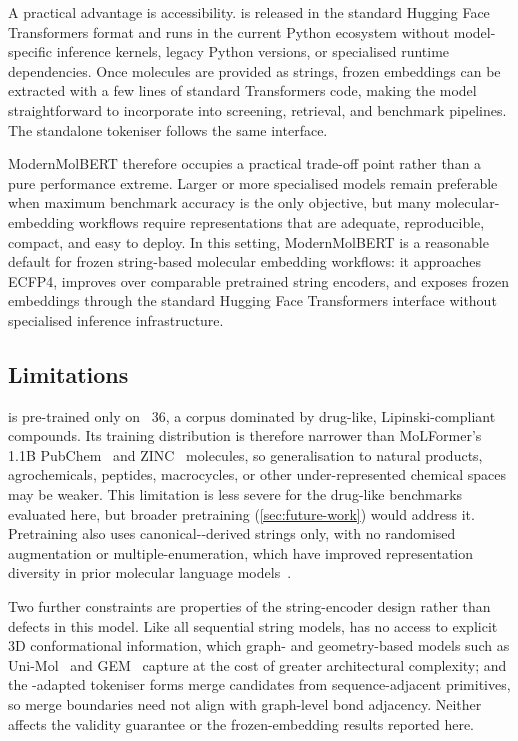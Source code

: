 \documentclass[11pt,a4paper]{article}
\begin{document}
A practical advantage is accessibility. \model{} is released in the standard Hugging Face Transformers format and runs in the current Python ecosystem without model-specific inference kernels, legacy Python versions, or specialised runtime dependencies. Once molecules are provided as \selfies{} strings, frozen embeddings can be extracted with a few lines of standard Transformers code, making the model straightforward to incorporate into screening, retrieval, and benchmark pipelines. The standalone \ape{} tokeniser follows the same interface.

ModernMolBERT therefore occupies a practical trade-off point rather than a pure performance extreme. Larger or more specialised models remain preferable when maximum benchmark accuracy is the only objective, but many molecular-embedding workflows require representations that are adequate, reproducible, compact, and easy to deploy. In this setting, ModernMolBERT is a reasonable default for frozen string-based molecular embedding workflows: it approaches ECFP4, improves over comparable pretrained string encoders, and exposes frozen embeddings through the standard Hugging Face Transformers interface without specialised inference infrastructure.

\subsection{Limitations}
\label{sec:limitations}


\model{} is pre-trained only on \chembl{}~36, a corpus dominated by drug-like,
Lipinski-compliant compounds. Its training distribution is therefore narrower
than MoLFormer's 1.1B PubChem~\citep{kimPubChem2023Update2023} and
ZINC~\citep{irwinZINC20FreeUltralargeScale2020} molecules, so generalisation to
natural products, agrochemicals, peptides, macrocycles, or other
under-represented chemical spaces may be weaker. This limitation is less severe
for the drug-like benchmarks evaluated here, but broader pretraining
(\cref{sec:future-work}) would address it. Pretraining also uses canonical-\smiles{}-derived \selfies{}
strings only, with no randomised \smiles{} augmentation or multiple-enumeration,
which have improved representation diversity in prior molecular language
models~\citep{winterLearningContinuousDataDriven2019,leeSimSonSimpleContrastive2025}.

Two further constraints are properties of the string-encoder design rather than
defects in this model. Like all sequential string models, \model{} has no
access to explicit 3D conformational information, which graph- and
geometry-based models such as Uni-Mol~\citep{zhouUniMolUniversal3D2023} and
GEM~\citep{fangGeometryenhancedMolecularRepresentation2022} capture at the cost
of greater architectural complexity; and the \selfies{}-adapted \ape{}
tokeniser forms merge candidates from sequence-adjacent primitives, so merge
boundaries need not align with graph-level bond adjacency. Neither affects the
\selfies{} validity guarantee or the frozen-embedding results reported here.
\end{document}
